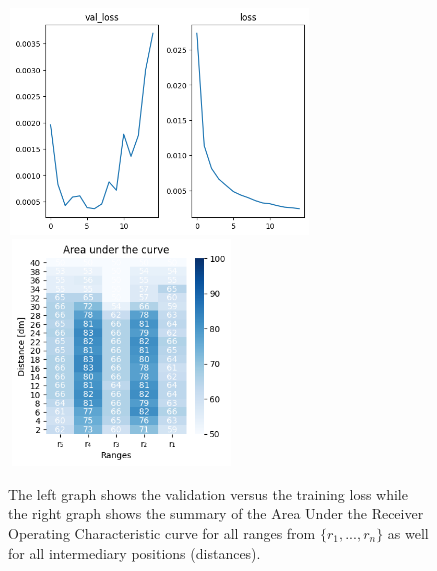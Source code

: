 \begin{multicols}{2}
\begin{itemize}
\end{itemize}
\end{multicols}\begin{figure}[H]%
\centering
\includegraphics[width=8cm,height=6cm]{3_models/models_42/graph_42.png}
\hspace{0.2 cm}
\includegraphics[width=6cm,height=6cm]{4_plots/plots_42/AUC_42.png}
\caption{The left graph shows the validation versus the training loss while the right graph shows the summary of the Area Under the Receiver Operating Characteristic curve for all ranges from $\{r_{1}, ... ,r_{n}\}$ as well for all intermediary positions (distances).}
\label{auc_42}
\end{figure}


\newpage
